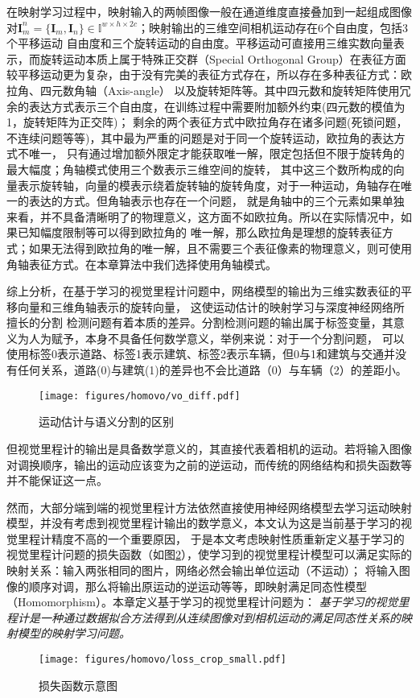 在映射学习过程中，映射输入的两帧图像一般在通道维度直接叠加到一起组成图像对$\mathbf{I}_m^n=\{\mathbf{I}_m,\mathbf{I}_n\} \in \mathbb{I}^{w\times h \times 2c}$；映射输出的三维空间相机运动存在6个自由度，包括3个平移运动
自由度和三个旋转运动的自由度。平移运动可直接用三维实数向量表示，而旋转运动本质上属于特殊正交群（Special Orthogonal Group）在表征方面较平移运动更为复杂，由于没有完美的表征方式存在，所以存在多种表征方式：欧拉角、四元数角轴（Axis-angle）
以及旋转矩阵等。其中四元数和旋转矩阵使用冗余的表达方式表示三个自由度，在训练过程中需要附加额外约束(四元数的模值为1，旋转矩阵为正交阵)；
剩余的两个表征方式中欧拉角存在诸多问题(死锁问题，不连续问题等等)，其中最为严重的问题是对于同一个旋转运动，欧拉角的表达方式不唯一，
只有通过增加额外限定才能获取唯一解，限定包括但不限于旋转角的最大幅度；角轴模式使用三个数表示三维空间的旋转，
其中这三个数所构成的向量表示旋转轴，向量的模表示绕着旋转轴的旋转角度，对于一种运动，角轴存在唯一的表达的方式。但角轴表示也存在一个问题，
就是角轴中的三个元素如果单独来看，并不具备清晰明了的物理意义，这方面不如欧拉角。所以在实际情况中，如果已知幅度限制等可以得到欧拉角的
唯一解，那么欧拉角是理想的旋转表征方式；如果无法得到欧拉角的唯一解，且不需要三个表征像素的物理意义，则可使用角轴表征方式。在本章算法中我们选择使用角轴模式。

综上分析，在基于学习的视觉里程计问题中，网络模型的输出为三维实数表征的平移向量和三维角轴表示的旋转向量，
这使运动估计的映射学习与深度神经网络所擅长的分割
检测问题有着本质的差异。分割检测问题的输出属于标签变量，其意义为人为赋予，本身不具备任何数学意义，举例来说：对于一个分割问题，
可以使用标签0表示道路、标签1表示建筑、标签2表示车辆，但0与1和建筑与交通并没有任何关系，道路(0)与建筑(1)的差异也不会比道路（0）与车辆（2）的差距小。

\begin{figure}[h]
    \centering
    \texttt{[image: figures/homovo/vo\_diff.pdf]}
    \caption{运动估计与语义分割的区别}
    \label{fig:vo_diff}
  \end{figure}
但视觉里程计的输出是具备数学意义的，其直接代表着相机的运动。若将输入图像对调换顺序，输出的运动应该变为之前的逆运动，而传统的网络结构和损失函数等并不能保证这一点。

然而，大部分端到端的视觉里程计方法依然直接使用神经网络模型去学习运动映射模型，并没有考虑到视觉里程计输出的数学意义，本文认为这是当前基于学习的视觉里程计精度不高的一个重要原因，
于是本文考虑映射性质重新定义基于学习的视觉里程计问题的损失函数（如图\ref{fig:homo_loss_problem}），使学习到的视觉里程计模型可以满足实际的映射关系：输入两张相同的图片，网络必然会输出单位运动（不运动）；
将输入图像的顺序对调，那么将输出原运动的逆运动等等，即映射满足同态性模型（Homomorphism）。本章定义基于学习的视觉里程计问题为：
\textit{基于学习的视觉里程计是一种通过数据拟合方法得到从连续图像对到相机运动的满足同态性关系的映射模型的映射学习问题。}
\begin{figure}[t]
    \centering
    \texttt{[image: figures/homovo/loss\_crop\_small.pdf]}
    \caption{损失函数示意图 }
    \label{fig:homo_loss_problem}
  \end{figure}

